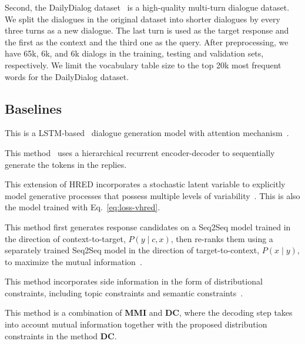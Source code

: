 \documentclass[sigconf]{acmart}
\begin{document}
Second, the DailyDialog dataset~\citep{li2017dailydialog} is a high-quality multi-turn dialogue dataset. We split the dialogues in the original dataset into shorter dialogues by every three turns as a new dialogue. The last turn is used as the target response and the first as the context and the third one as the query. After preprocessing, we have 65k, 6k, and 6k dialogs in the training, testing and validation sets, respectively. We limit the vocabulary table size to the top 20k most frequent words for the DailyDialog dataset.

\subsection{Baselines}
\begin{description}[leftmargin=\parindent,nosep]
\item[\textbf{Seq2SeqAtt}] This is a LSTM-based~\citep{hochreiter1997long} dialogue generation model with attention mechanism~\citep{bahdanau2014neural}.
\item[\textbf{HRED}] This method~\citep{serban2016hred} uses a hierarchical recurrent encoder-decoder to sequentially generate the tokens in the replies.
\item[\textbf{VHRED}] This extension of HRED incorporates a stochastic latent variable to explicitly model generative processes that possess multiple levels of variability~\citep{serban2017hierarchical}. This is also the model trained with Eq.~\ref{eq:loss-vhred}.
\item[\textbf{MMI}] This method first generates response candidates on a Seq2Seq model trained in the direction of context-to-target, $P(y\mid c,x)$, then re-ranks them using a separately trained Seq2Seq model in the direction of target-to-context, $P(x\mid y)$, to maximize the mutual information~\citep{li2015diversity}.
\item[\textbf{DC}] This method incorporates side information in the form of distributional constraints, including topic constraints and semantic constraints~\citep{baheti2018generating}.
\item[\textbf{DC-MMI}] This method is a combination of \textbf{MMI} and \textbf{DC}, where the decoding step takes into account mutual information together with the proposed distribution constraints in the method \textbf{DC}. 
\end{description}
\end{document}
